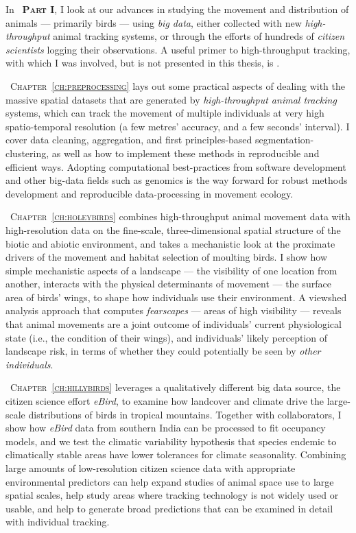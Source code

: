 \medskip

\noindent In {\scshape~\textbf{Part I}}, I look at our advances in studying the movement and distribution of animals --- primarily birds --- using \textit{big data}, either collected with new \textit{high-throughput} animal tracking systems, or through the efforts of hundreds of \textit{citizen scientists} logging their observations.
A useful primer to high-throughput tracking, with which I was involved, but is not presented in this thesis, is \textcite{nathan2022}.

\medskip

{\scshape~Chapter~\ref{ch:preprocessing}} lays out some practical aspects of dealing with the massive spatial datasets that are generated by \textit{high-throughput animal tracking} systems, which can track the movement of multiple individuals at very high spatio-temporal resolution (a few metres' accuracy, and a few seconds' interval).
I cover data cleaning, aggregation, and first principles-based segmentation-clustering, as well as how to implement these methods in reproducible and efficient ways.
Adopting computational best-practices from software development and other big-data fields such as genomics is the way forward for robust methods development and reproducible data-processing in movement ecology.

{\scshape~Chapter~\ref{ch:holeybirds}} combines high-throughput animal movement data with high-resolution data on the fine-scale, three-dimensional spatial structure of the biotic and abiotic environment, and takes a mechanistic look at the proximate drivers of the movement and habitat selection of moulting birds.
I show how simple mechanistic aspects of a landscape --- the visibility of one location from another, interacts with the physical determinants of movement --- the surface area of birds' wings, to shape how individuals use their environment.
A viewshed analysis approach that computes \textit{fearscapes} --- areas of high visibility --- reveals that animal movements are a joint outcome of individuals' current physiological state (i.e., the condition of their wings), and individuals' likely perception of landscape risk, in terms of whether they could potentially be seen by \textit{other individuals}.

{\scshape~Chapter~\ref{ch:hillybirds}} leverages a qualitatively different big data source, the citizen science effort \textit{eBird}, to examine how landcover and climate drive the large-scale distributions of birds in tropical mountains.
Together with collaborators, I show how \textit{eBird} data from southern India can be processed to fit occupancy models, and we test the climatic variability hypothesis that species endemic to climatically stable areas have lower tolerances for climate seasonality.
Combining large amounts of low-resolution citizen science data with appropriate environmental predictors can help expand studies of animal space use to large spatial scales, help study areas where tracking technology is not widely used or usable, and help to generate broad predictions that can be examined in detail with individual tracking.

